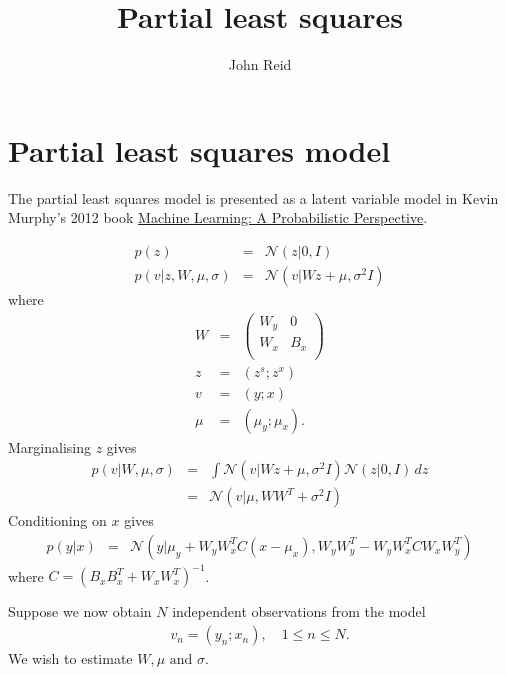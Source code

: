 \documentclass{article}
\title{Partial least squares}
\author{John Reid}
\begin{document}
\section{Partial least squares model}

The partial least
squares model is presented as a latent variable model in Kevin Murphy's 2012
book \href{https://probml.github.io/pml-book/}{Machine Learning: A
Probabilistic Perspective}.

\begin{eqnarray}
  p(z) &=& \mathcal{N}(z|0, I) \\
  p(v|z, W, \mu, \sigma) &=& \mathcal{N}(v|W z + \mu, \sigma^2 I)
\end{eqnarray}
where
\begin{eqnarray}
  W &=& \begin{pmatrix}
      W_y & 0 \\
      W_x & B_x \\
    \end{pmatrix} \\
  z &=& (z^s; z^x) \\
  v &=& (y; x) \\
  \mu &=& (\mu_y; \mu_x).
\end{eqnarray}
Marginalising $z$ gives
\begin{eqnarray}
  p(v|W, \mu, \sigma)
  &=& \int \mathcal{N}(v|W z + \mu, \sigma^2 I) \mathcal{N}(z|0, I)\,dz \\
  &=& \mathcal{N}(v|\mu, W W^T + \sigma^2 I)
\end{eqnarray}
Conditioning on $x$ gives
\begin{eqnarray}
  p(y|x) &=& \mathcal{N}(y|\mu_y + W_y W_x^T C (x - \mu_x),
                           W_y W_y^T - W_y W_x^T C W_x W_y^T)
\end{eqnarray}
where $C={(B_x B_x^T + W_x W_x^T)}^{-1}$.

Suppose we now obtain $N$ independent observations from the model
\begin{eqnarray}
  v_n = (y_n; x_n),\quad 1 \le n \le N.
\end{eqnarray}
We wish to estimate $W, \mu \text{ and } \sigma$.
\end{document}
